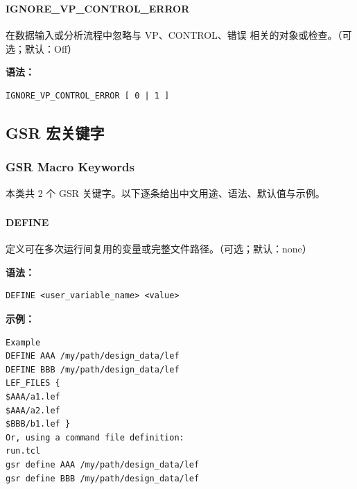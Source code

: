\subsubsection{}
\paragraph*{IGNORE_VP_CONTROL_ERROR}

在数据输入或分析流程中忽略与 VP、CONTROL、错误 相关的对象或检查。（可选；默认：Off）

\textbf{语法：}
\begin{lstlisting}
IGNORE_VP_CONTROL_ERROR [ 0 | 1 ]
\end{lstlisting}

\subsection{GSR 宏关键字}
\subsubsection*{GSR Macro Keywords}

本类共 2 个 GSR 关键字。以下逐条给出中文用途、语法、默认值与示例。

\subsubsection{}
\paragraph*{DEFINE}

定义可在多次运行间复用的变量或完整文件路径。（可选；默认：none）

\textbf{语法：}
\begin{lstlisting}
DEFINE <user_variable_name> <value>
\end{lstlisting}

\textbf{示例：}
\begin{lstlisting}
Example
DEFINE AAA /my/path/design_data/lef
DEFINE BBB /my/path/design_data/lef
LEF_FILES {
$AAA/a1.lef
$AAA/a2.lef
$BBB/b1.lef }
Or, using a command file definition:
run.tcl
gsr define AAA /my/path/design_data/lef
gsr define BBB /my/path/design_data/lef
\end{lstlisting}

\subsubsection{}
